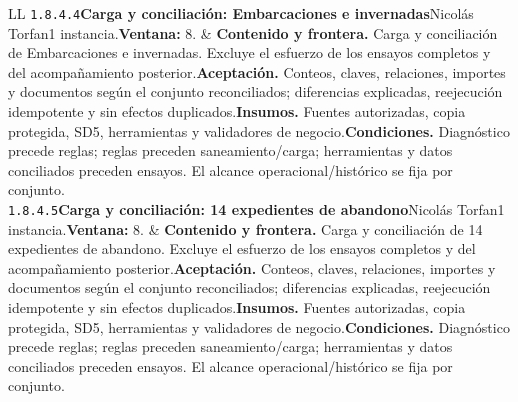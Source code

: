 \begin{longtable}{L{\tabcolsep\relax}L{\tabcolsep\relax}}
\texttt{1.\allowbreak{}8.\allowbreak{}4.\allowbreak{}4}\newline{}\textbf{Carga y conciliación: Embarcaciones e invernadas}\newline{}Nicolás Torfan\newline{}1 instancia.\newline{}\textbf{Ventana:} 8. & \textbf{Contenido y frontera.} Carga y conciliación de Embarcaciones e invernadas. Excluye el esfuerzo de los ensayos completos y del acompañamiento posterior.\newline{}\textbf{Aceptación.} Conteos, claves, relaciones, importes y documentos según el conjunto reconciliados; diferencias explicadas, reejecución idempotente y sin efectos duplicados.\newline{}\textbf{Insumos.} Fuentes autorizadas, copia protegida, SD5, herramientas y validadores de negocio.\newline{}\textbf{Condiciones.} Diagnóstico precede reglas; reglas preceden saneamiento/carga; herramientas y datos conciliados preceden ensayos. El alcance operacional/histórico se fija por conjunto.\\\hline
\texttt{1.\allowbreak{}8.\allowbreak{}4.\allowbreak{}5}\newline{}\textbf{Carga y conciliación: 14 expedientes de abandono}\newline{}Nicolás Torfan\newline{}1 instancia.\newline{}\textbf{Ventana:} 8. & \textbf{Contenido y frontera.} Carga y conciliación de 14 expedientes de abandono. Excluye el esfuerzo de los ensayos completos y del acompañamiento posterior.\newline{}\textbf{Aceptación.} Conteos, claves, relaciones, importes y documentos según el conjunto reconciliados; diferencias explicadas, reejecución idempotente y sin efectos duplicados.\newline{}\textbf{Insumos.} Fuentes autorizadas, copia protegida, SD5, herramientas y validadores de negocio.\newline{}\textbf{Condiciones.} Diagnóstico precede reglas; reglas preceden saneamiento/carga; herramientas y datos conciliados preceden ensayos. El alcance operacional/histórico se fija por conjunto.\\\hline

\end{longtable}

